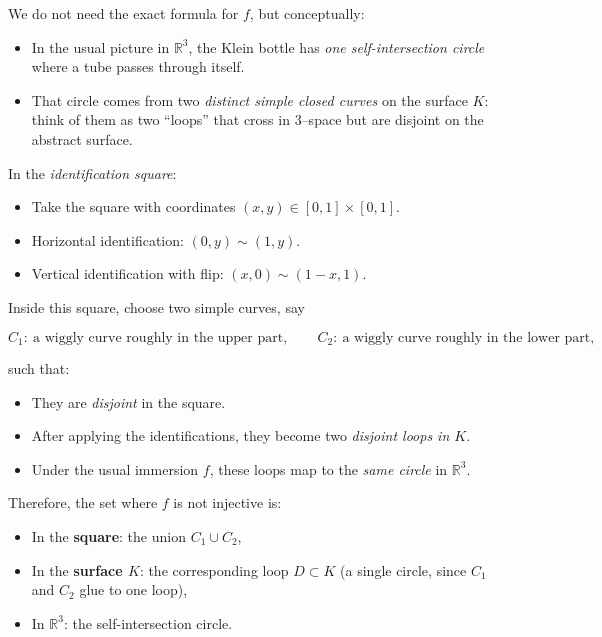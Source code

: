 \documentclass[12pt,a4paper]{article}
\theoremstyle{plain}
\theoremstyle{definition}      %
\begin{document}
We do not need the exact formula for $f$, but conceptually:

\begin{itemize}
	\item In the usual picture in $\mathbb{R}^3$, the Klein bottle has \emph{one self-intersection circle} where a tube passes through itself.
	\item That circle comes from two \emph{distinct simple closed curves} on the surface $K$: think of them as two “loops” that cross in $3$--space but are disjoint on the abstract surface.
\end{itemize}

In the \emph{identification square}:

\begin{itemize}
	\item Take the square with coordinates $(x,y)\in[0,1]\times[0,1]$.
	\item Horizontal identification: $(0,y)\sim(1,y)$.
	\item Vertical identification with flip: $(x,0)\sim(1-x,1)$.
\end{itemize}

Inside this square, choose two simple curves, say

\[
C_1:\ \text{a wiggly curve roughly in the upper part}, \qquad
C_2:\ \text{a wiggly curve roughly in the lower part},
\]

such that:

\begin{itemize}
	\item They are \emph{disjoint} in the square.
	\item After applying the identifications, they become two \emph{disjoint loops in $K$}.
	\item Under the usual immersion $f$, these loops map to the \emph{same circle} in $\mathbb{R}^3$.
\end{itemize}

Therefore, the set where $f$ is not injective is:

\begin{itemize}
	\item In the \textbf{square}: the union $C_1\cup C_2$,
	\item In the \textbf{surface $K$}: the corresponding loop $D\subset K$ (a single circle, since $C_1$ and $C_2$ glue to one loop),
	\item In \textbf{$\mathbb{R}^3$}: the self-intersection circle.
\end{itemize}
\end{document}
